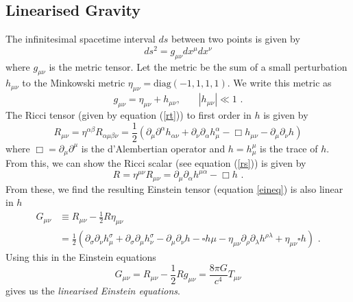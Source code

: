 \documentclass[11pt]{cuthesis}
\newcommand{\mn}{_{\mu\nu}}
\newcommand{\fs}{\text{ .}}
\newcommand{\pd}{\partial}
\begin{document}
\subsection{Linearised Gravity}
The infinitesimal spacetime interval $ds$ between two points is given by
\begin{equation}
ds^2 = g\mn dx^\mu dx^\nu
\end{equation}  
where $g\mn$ is the metric tensor. Let the metric be the sum of a small perturbation $h_{\mu\nu}$ to the Minkowski metric $\eta\mn=\text{diag}(-1,1,1,1)$. We write this metric as 
\begin{equation} \label{pert metric}
g\mn=\eta_{\mu\nu}+h_{\mu\nu} \text{, } \hspace{20pt} |h_{\mu\nu}| \ll 1 \text{ .}
\end{equation}
The Ricci tensor (given by equation (\ref{rt})) to first order in $h$ is given by
\begin{equation} \label{lin rt}
R\mn =\eta^{\alpha \beta}R_{\alpha \mu \beta \nu} = \frac{1}{2}\left( \pd_\mu \pd ^\alpha h_{\alpha \nu} + \pd_\nu \pd_\alpha h^\alpha_\mu -\Box h\mn -\pd_\mu \pd_\nu h \right) 
\end{equation}
where $\Box=\pd_\mu \pd^\mu $ is the d'Alembertian operator and $h=h^\mu_\mu$ is the trace of $h$. From this, we can show the Ricci scalar (see equation (\ref{rs})) is given by
\begin{equation} \label{lin rs}
R=\eta^{\mu \nu}R\mn=\pd _\mu \pd_ \alpha h^{\mu \alpha} - \Box h \fs
\end{equation}
From these, we find the resulting Einstein tensor (equation \ref{eineq}) is also linear in $h$ 
\begin{equation} \label{lin Einstein}
\begin{split}
G\mn & \equiv R\mn -\frac{1}{2} R \eta\mn \\
 & = \frac{1}{2} ( \partial_\sigma \partial_\nu h^\sigma_\mu + \partial_\sigma \partial_\mu h^\sigma_\nu - \partial_\mu \partial_\nu h - \square h\mu -\eta\mn \partial_\rho \partial_\lambda h^{\rho \lambda} + \eta\mn \square h ) \fs
\end{split}
\end{equation}
Using this in the Einstein equations
\begin{equation}
G\mn =R\mn -\frac{1}{2} R g\mn=\frac{8 \pi G}{c^4}T\mn
\end{equation}
gives us the \textit{linearised Einstein equations}. 
\end{document}
